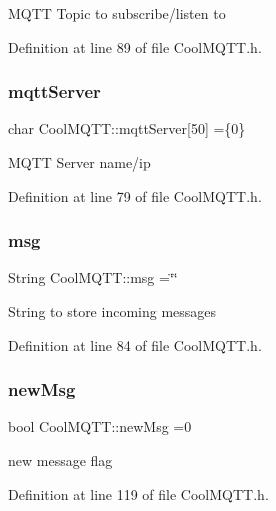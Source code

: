 M\+Q\+TT Topic to subscribe/listen to 

Definition at line 89 of file Cool\+M\+Q\+T\+T.\+h.

\mbox{\label{class_cool_m_q_t_t_ab8bb951f87ddbf92db74c2ad16a3e53e}} 
\subsubsection{\texorpdfstring{mqtt\+Server}{mqttServer}}
{\footnotesize\ttfamily char Cool\+M\+Q\+T\+T\+::mqtt\+Server\mbox{[}50\mbox{]} =\{\textquotesingle{}0\textquotesingle{}\}\hspace{0.3cm}{\ttfamily [private]}}

M\+Q\+TT Server name/ip 

Definition at line 79 of file Cool\+M\+Q\+T\+T.\+h.

\mbox{\label{class_cool_m_q_t_t_af6b19e7074dbbb4ae493c44dcb53f7ff}} 
\subsubsection{\texorpdfstring{msg}{msg}}
{\footnotesize\ttfamily String Cool\+M\+Q\+T\+T\+::msg =\char`\"{}\char`\"{}\hspace{0.3cm}{\ttfamily [private]}}

String to store incoming messages 

Definition at line 84 of file Cool\+M\+Q\+T\+T.\+h.

\mbox{\label{class_cool_m_q_t_t_a3240388137b885775aadf38e96b24c6b}} 
\subsubsection{\texorpdfstring{new\+Msg}{newMsg}}
{\footnotesize\ttfamily bool Cool\+M\+Q\+T\+T\+::new\+Msg =0\hspace{0.3cm}{\ttfamily [private]}}

new message flag 

Definition at line 119 of file Cool\+M\+Q\+T\+T.\+h.

